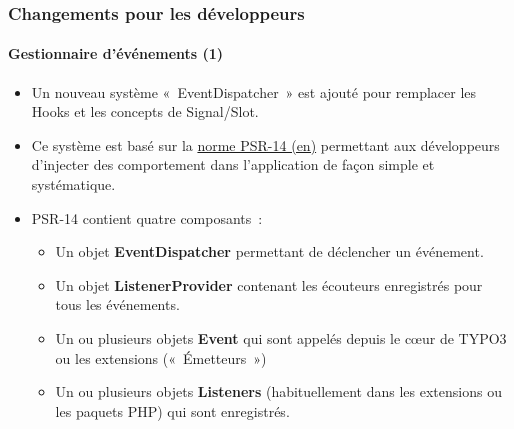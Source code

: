 \begin{frame}[fragile]
	\frametitle{Changements pour les développeurs}
	\framesubtitle{Gestionnaire d'événements (1)}

	\begin{itemize}
		\item Un nouveau système «~EventDispatcher~» est ajouté pour remplacer les Hooks et
			les concepts de Signal/Slot.

		\item Ce système est basé sur la \href{https://www.php-fig.org/psr/psr-14}{norme PSR-14 (en)}
			permettant aux développeurs d'injecter des comportement dans l'application de façon
			simple et systématique.

		\item PSR-14 contient quatre composants~:

			\begin{itemize}
				\item Un objet \textbf{EventDispatcher} permettant de déclencher un événement.
				\item Un objet \textbf{ListenerProvider} contenant les écouteurs enregistrés pour
					tous les événements.
				\item Un ou plusieurs objets \textbf{Event} qui sont appelés depuis le cœur de TYPO3
					ou les extensions («~Émetteurs~»)
				\item Un ou plusieurs objets \textbf{Listeners} (habituellement dans les extensions
					ou les paquets PHP) qui sont enregistrés.
			\end{itemize}


	\end{itemize}

\end{frame}



